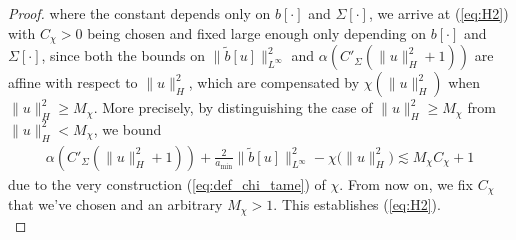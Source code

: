 \begin{proof}
where the constant depends only on $b[\cdot]$ and $\Sigma[\cdot]$, we arrive at (\ref{eq:H2}) with $C_{\chi} > 0$ being chosen and fixed large enough only depending on $b[\cdot]$ and $\Sigma[\cdot]$, since both the bounds on $\|\tilde{b}[u]\|_{L^{\infty}}^2$ and $\alpha(C'_{\Sigma}(\|u\|_H^2 + 1))$ are affine with respect to $\|u\|_H^2$, which are compensated by $\chi(\|u\|_H^2)$ when $\|u\|_H^2 \geq M_{\chi}$. More precisely, by distinguishing the case of 
$\|u\|_{H}^2 \geq M_{\chi}$ from $\|u\|_{H}^2 < M_{\chi}$, we bound
\begin{align*}
    \alpha(C'_{\Sigma}(\|u\|_H^2 + 1)) + \frac{2}{a_{\min}} \big\|\tilde{b}[u]\big\|_{L^{\infty}}^2  - \chi\big( \|u\|^2_{H}\big) \lesssim M_{\chi}C_{\chi} + 1
\end{align*}
due to the very construction (\ref{eq:def_chi_tame}) of $\chi$. From now on, we fix $C_{\chi}$ that we've chosen and an arbitrary $M_{\chi} > 1$. This establishes (\ref{eq:H2}). \\


\end{proof}
